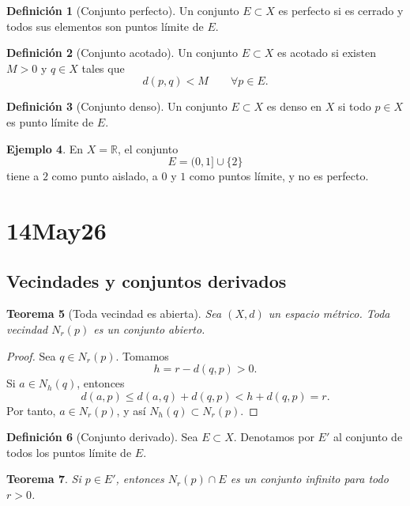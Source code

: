 \documentclass[12pt]{article}
\theoremstyle{definition}
\newtheorem{definition}{Definición}[section]
\newtheorem{example}[definition]{Ejemplo}
\theoremstyle{plain}
\newtheorem{theorem}[definition]{Teorema}
\theoremstyle{remark}
\begin{document}
\begin{definition}[Conjunto perfecto]
Un conjunto $E\subset X$ es perfecto si es cerrado y todos sus elementos son puntos límite de $E$.
\end{definition}

\begin{definition}[Conjunto acotado]
Un conjunto $E\subset X$ es acotado si existen $M>0$ y $q\in X$ tales que
\[
d(p,q)<M\qquad \forall p\in E.
\]
\end{definition}

\begin{definition}[Conjunto denso]
Un conjunto $E\subset X$ es denso en $X$ si todo $p\in X$ es punto límite de $E$.
\end{definition}

\begin{example}
En $X=\mathbb R$, el conjunto
\[
E=(0,1]\cup\{2\}
\]
tiene a $2$ como punto aislado, a $0$ y $1$ como puntos límite, y no es perfecto.
\end{example}

\section*{14May26}

\subsection*{Vecindades y conjuntos derivados}

\begin{theorem}[Toda vecindad es abierta]
Sea $(X,d)$ un espacio métrico. Toda vecindad $N_r(p)$ es un conjunto abierto.
\end{theorem}

\begin{proof}
Sea $q\in N_r(p)$.
Tomamos
\[
h=r-d(q,p)>0.
\]
Si $a\in N_h(q)$, entonces
\[
d(a,p)\le d(a,q)+d(q,p)<h+d(q,p)=r.
\]
Por tanto, $a\in N_r(p)$, y así $N_h(q)\subset N_r(p)$.
\end{proof}

\begin{definition}[Conjunto derivado]
Sea $E\subset X$.
Denotamos por $E'$ al conjunto de todos los puntos límite de $E$.
\end{definition}

\begin{theorem}
Si $p\in E'$, entonces $N_r(p)\cap E$ es un conjunto infinito para todo $r>0$.
\end{theorem}
\end{document}
